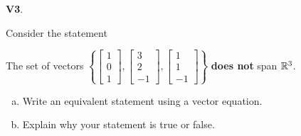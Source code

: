 \documentclass{article}
\newenvironment{problem}[1]
{
  \begin{flushleft}
  \textbf{#1}.
  \ignorespaces
}
{
  \end{flushleft}
}
\begin{document}
\begin{problem}{V3}
Consider the statement

\begin{center}\begin{minipage}{0.8\textwidth}
The set of vectors
\(\left\{\begin{bmatrix} 1 \\ 0 \\ 1 \end{bmatrix} ,
\begin{bmatrix} 3 \\ 2 \\ -1 \end{bmatrix} , 
\begin{bmatrix} 1 \\ 1 \\ -1 \end{bmatrix} \right\}\) \textbf{does not} span \(\mathbb{R}^3\).
\end{minipage}\end{center}

\begin{enumerate}[(a)]
\item Write an equivalent statement using a vector equation.
\item Explain why your statement is true or false.
\end{enumerate}
\end{problem}
\end{document}
